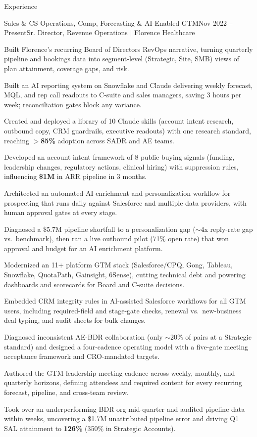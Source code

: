 \documentclass{resume}
\begin{document}
\begin{rSection}{Experience}
\begin{rSubsection}{Sales \& CS Operations, Comp, Forecasting \& AI-Enabled GTM}{\textcolor{black!60}{Nov 2022 -- Present}}{Sr. Director, Revenue Operations $\vert$ Florence Healthcare}{}
\item Built Florence's recurring Board of Directors RevOps narrative, turning quarterly pipeline and bookings data into segment-level (Strategic, Site, SMB) views of plan attainment, coverage gaps, and risk.
\item Built an AI reporting system on Snowflake and Claude delivering weekly forecast, MQL, and rep call readouts to C-suite and sales managers, saving 3 hours per week; reconciliation gates block any variance.
\item Created and deployed a library of 10 Claude skills (account intent research, outbound copy, CRM guardrails, executive readouts) with one research standard, reaching $>$\textbf{85\%} adoption across SADR and AE teams.
\item Developed an account intent framework of 8 public buying signals (funding, leadership changes, regulatory actions, clinical hiring) with suppression rules, influencing \textbf{\$1M} in ARR pipeline in 3 months.
\item Architected an automated AI enrichment and personalization workflow for prospecting that runs daily against Salesforce and multiple data providers, with human approval gates at every stage.
\item Diagnosed a \$5.7M pipeline shortfall to a personalization gap ($\sim$4x reply-rate gap vs.\ benchmark), then ran a live outbound pilot (71\% open rate) that won approval and budget for an AI enrichment platform.
\item Modernized an 11+ platform GTM stack (Salesforce/CPQ, Gong, Tableau, Snowflake, QuotaPath, Gainsight, 6Sense), cutting technical debt and powering dashboards and scorecards for Board and C-suite decisions.
\item Embedded CRM integrity rules in AI-assisted Salesforce workflows for all GTM users, including required-field and stage-gate checks, renewal vs.\ new-business deal typing, and audit sheets for bulk changes.
\item Diagnosed inconsistent AE-BDR collaboration (only $\sim$20\% of pairs at a Strategic standard) and designed a four-cadence operating model with a five-gate meeting acceptance framework and CRO-mandated targets.
\item Authored the GTM leadership meeting cadence across weekly, monthly, and quarterly horizons, defining attendees and required content for every recurring forecast, pipeline, and cross-team review.
\item Took over an underperforming BDR org mid-quarter and audited pipeline data within weeks, uncovering a \$1.7M unattributed pipeline error and driving Q1 SAL attainment to \textbf{126\%} (350\% in Strategic Accounts).

\end{rSubsection}
\end{rSection}
\end{document}
